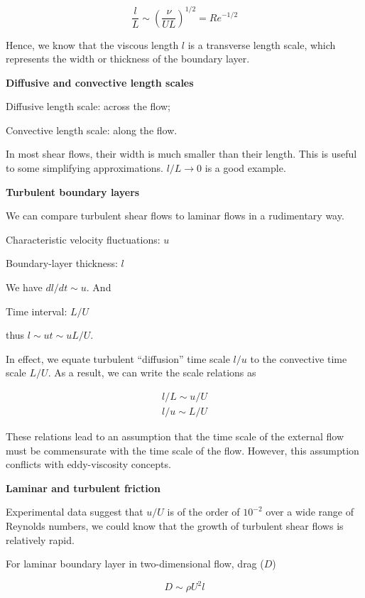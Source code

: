 \documentclass{article}
\begin{document}
\begin{equation*}
    \frac{l}{L}\sim\left(\frac{\nu}{UL}\right)^{1/2}=Re^{-1/2}
\end{equation*}

Hence, we know that the viscous length $l$ is a transverse length scale, which represents the width or thickness of the boundary layer.

\textbf{Diffusive and convective length scales}

Diffusive length scale: across the flow;

Convective length scale: along the flow.

In most shear flows, their width is much smaller than their length. This is useful to some simplifying approximations. $l/L\rightarrow 0$ is a good example.

\textbf{Turbulent boundary layers}

We can compare turbulent shear flows to laminar flows in a rudimentary way.

Characteristic velocity fluctuations: $u$

Boundary-layer thickness: $l$

We have $dl/dt\sim u$. And

Time interval: $L/U$

thus $l\sim ut \sim uL/U$.

In effect, we equate turbulent ``diffusion'' time scale $l/u$ to the convective time scale $L/U$. As a result, we can write the scale relations as

\begin{gather*}
    l/L\sim u/U\\
    l/u\sim L/U
\end{gather*}

These relations lead to an assumption that the time scale of the external flow must be commensurate with the time scale of the flow. However, this assumption conflicts with eddy-viscosity concepts.

\textbf{Laminar and turbulent friction}

Experimental data suggest that $u/U$ is of the order of $10^{-2}$ over a wide range of Reynolds numbers, we could know that the growth of turbulent shear flows is relatively rapid.

For laminar boundary layer in two-dimensional flow, drag ($D$)

\begin{equation*}
    D\sim\rho U^2 l
\end{equation*}
\end{document}
